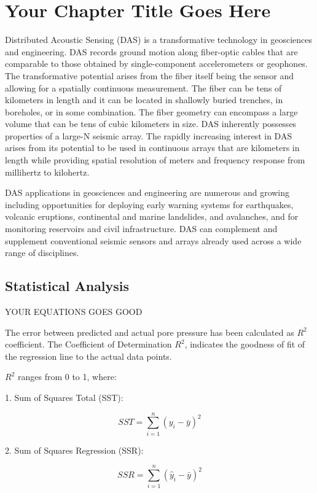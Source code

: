 \chapter{Your Chapter Title Goes Here }

Distributed Acoustic Sensing (DAS) is a transformative technology in geosciences and engineering. DAS records ground motion along fiber-optic cables that are comparable to those obtained by single-component accelerometers or geophones. The transformative potential arises from the fiber itself being the sensor and allowing for a spatially continuous measurement. The fiber can be tens of kilometers in length and it can be located in shallowly buried trenches, in boreholes, or in some combination. The fiber geometry can encompass a large volume that can be tens of cubic kilometers in size. DAS inherently possesses properties of a large-N seismic array. The rapidly increasing interest in DAS arises from its potential to be used in continuous arrays that are kilometers in length while providing spatial resolution of meters and frequency response from millihertz to kilohertz.

DAS applications in geosciences and engineering are numerous and growing including opportunities for deploying early warning systems for earthquakes, volcanic eruptions, continental and marine landslides, and avalanches, and for monitoring reservoirs and civil infrastructure. DAS can complement and supplement conventional seismic sensors and arrays already used across a wide range of disciplines.

\section{Statistical Analysis}

YOUR EQUATIONS GOES GOOD

The error between predicted and actual pore pressure has been calculated as \( R^2 \) coefficient. The Coefficient of Determination  \( R^2 \), indicates the goodness of fit of the regression line to the actual data points.

 \( R^2 \) ranges from 0 to 1, where:
 

1. Sum of Squares Total (SST):

   \[ SST = \sum_{i=1}^{n} (y_i - \bar{y})^2 \]

2. Sum of Squares Regression (SSR):

   \[ SSR = \sum_{i=1}^{n} (\hat{y}_i - \bar{y})^2 \]

\newpage
